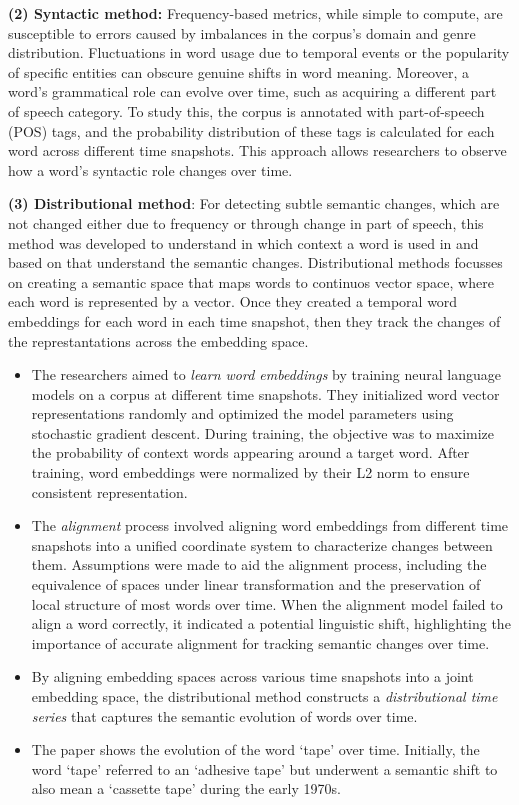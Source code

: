 \textbf{(2) Syntactic method:}
Frequency-based metrics, while simple to compute, are susceptible to errors caused by imbalances in the corpus's domain and genre distribution.
Fluctuations in word usage due to temporal events or the popularity of specific entities can obscure genuine shifts in word meaning.
Moreover, a word's grammatical role can evolve over time, such as acquiring a different part of speech category.
To study this, the corpus is annotated with part-of-speech (POS) tags, and the probability distribution of these tags is calculated for each word across different time snapshots.
This approach allows researchers to observe how a word’s syntactic role changes over time.

\textbf{(3) Distributional method}:
For detecting subtle semantic changes, which are not changed either due to frequency or through change in part of speech,
this method was developed to understand in which context a word is used in and based on that understand the semantic changes.
Distributional methods focusses on creating a semantic space that maps words to continuos vector space, where each word is represented by a vector.
Once they created a temporal word embeddings for each word in each time snapshot, then they track the changes of the represtantations across the embedding space.

\begin{itemize}
    \item The researchers aimed to \emph{learn word embeddings} by training neural language models on a corpus at different time snapshots.
        They initialized word vector representations randomly and optimized the model parameters using stochastic gradient descent.
        During training, the objective was to maximize the probability of context words appearing around a target word.
        After training, word embeddings were normalized by their L2 norm to ensure consistent representation.
    \item The \emph{alignment} process involved aligning word embeddings from different time snapshots into a unified coordinate system to characterize changes between them.
        Assumptions were made to aid the alignment process, including the equivalence of spaces under linear transformation and the preservation of local structure of most words over time.
        When the alignment model failed to align a word correctly, it indicated a potential linguistic shift, highlighting the importance of accurate alignment for tracking semantic changes over time.
    \item By aligning embedding spaces across various time snapshots into a joint embedding space,
        the distributional method constructs a \emph{distributional time series} that captures the semantic evolution of words over time.
    \item The paper shows the evolution of the word `tape' over time.
        Initially, the word `tape' referred to an `adhesive tape' but underwent a semantic shift to also mean a `cassette tape' during the early 1970s.
\end{itemize}

